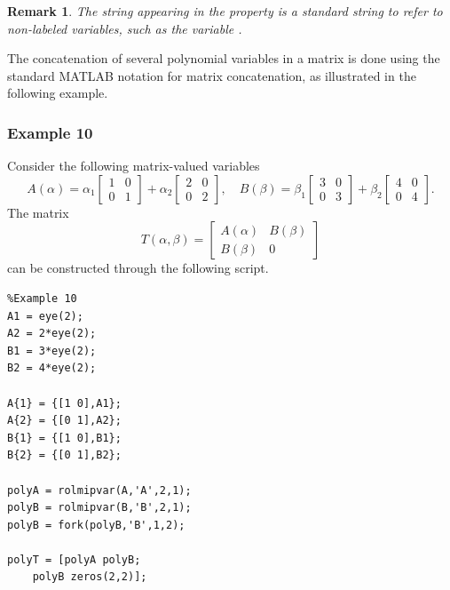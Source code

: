 \documentclass[english,11pt]{article}
\theoremstyle{break} \theorembodyfont{\small\rm}
\newtheorem{rem}{\bf Remark}
\newenvironment{remark}
{\begin{rem}} {\hspace*{\fill}\nolinebreak[1]
\end{rem}
}
\begin{document}
\begin{remark}
 The string \mcode{<>} appearing in the  property is a standard string to refer to non-labeled variables,
 such as the variable .
\end{remark}



The concatenation of several polynomial  variables in a matrix is done using the standard MATLAB notation for matrix concatenation, as illustrated in the following example.

\subsubsection*{Example 10}
Consider the following matrix-valued variables
\[
 A(\alpha) = \alpha_1\begin{bmatrix} 1 & 0 \\ 0 & 1 \end{bmatrix}
 + \alpha_2\begin{bmatrix} 2 & 0 \\ 0 & 2 \end{bmatrix}, \quad
 B(\beta) = \beta_1\begin{bmatrix} 3 & 0 \\ 0 & 3 \end{bmatrix}
 + \beta_2\begin{bmatrix} 4 & 0 \\ 0 & 4 \end{bmatrix}.
\]
The matrix
\[
 T(\alpha,\beta) = \begin{bmatrix} A(\alpha) & B(\beta) \\ B(\beta) & 0 \end{bmatrix}
\]
can be constructed through the following script.

\begin{minipage}{9.5cm}
 \begin{lstlisting}
%Example 10
A1 = eye(2);
A2 = 2*eye(2);
B1 = 3*eye(2);
B2 = 4*eye(2);

A{1} = {[1 0],A1};
A{2} = {[0 1],A2};
B{1} = {[1 0],B1};
B{2} = {[0 1],B2};

polyA = rolmipvar(A,'A',2,1);
polyB = rolmipvar(B,'B',2,1);
polyB = fork(polyB,'B',1,2);

polyT = [polyA polyB;
    polyB zeros(2,2)];
 \end{lstlisting}
\end{minipage}
\vspace{0.2cm}
\end{document}

